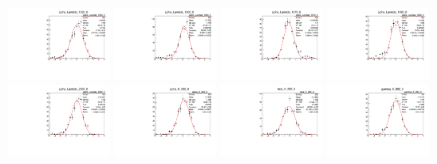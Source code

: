 \begin{figure}[h]
    \includegraphics[width=0.24\textwidth]{figure/io_wo_bkg/alpha/pull_alpha_Lambda_1520_0.pdf}
    \includegraphics[width=0.24\textwidth]{figure/io_wo_bkg/alpha/pull_alpha_Lambda_1600_0.pdf}
    \includegraphics[width=0.24\textwidth]{figure/io_wo_bkg/alpha/pull_alpha_Lambda_1670_0.pdf}
    \includegraphics[width=0.24\textwidth]{figure/io_wo_bkg/alpha/pull_alpha_Lambda_1690_0.pdf}
    \includegraphics[width=0.24\textwidth]{figure/io_wo_bkg/alpha/pull_alpha_Lambda_2000_0.pdf}
    \includegraphics[width=0.24\textwidth]{figure/io_wo_bkg/alpha/pull_alpha_alpha_K_892_0.pdf}
    \includegraphics[width=0.24\textwidth]{figure/io_wo_bkg/alpha/pull_alpha_beta_K_892_0.pdf}
    \includegraphics[width=0.24\textwidth]{figure/io_wo_bkg/alpha/pull_alpha_gamma_K_892_0.pdf}

\end{figure}
